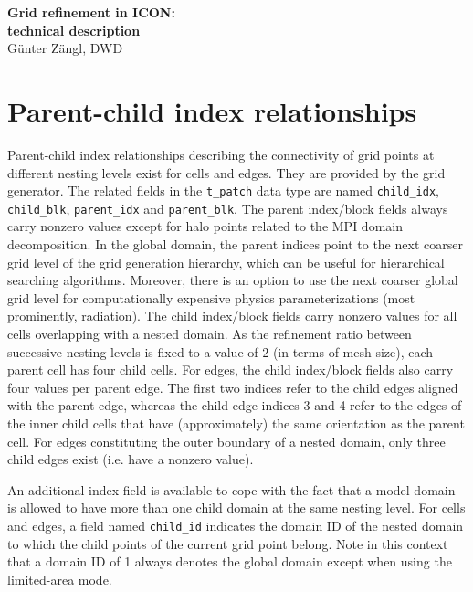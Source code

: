 \documentclass[11pt]{article}
\begin{document}
\setlength{\baselineskip}{25pt}


\begin{center}
{\huge \bf {Grid refinement in ICON: \\ technical description}} \\ \bigskip
{\Large G\"unter Z\"angl, DWD}
\end{center}

\setlength{\baselineskip}{14pt}

\bigskip

\section{Parent-child index relationships}

Parent-child index relationships describing the connectivity of grid points at different nesting levels
exist for cells and edges. They are provided by the grid generator.
The related fields in the \verb+t_patch+ data type are named \verb+child_idx+, 
\verb+child_blk+, \verb+parent_idx+ and \verb+parent_blk+. 
The parent index/block fields always carry nonzero values except for halo points related to the MPI domain
decomposition. In the global domain, the parent indices point to the next coarser grid level of the grid
generation hierarchy, which can be useful for hierarchical searching algorithms. Moreover, there is an
option to use the next coarser global grid level for computationally expensive physics parameterizations
(most prominently, radiation). The child index/block fields carry nonzero
values for all cells overlapping with a nested domain. As the refinement ratio between successive nesting
levels is fixed to a value of 2 (in terms of mesh size), each parent cell has four child cells. 
For edges, the child index/block fields also carry four values per parent edge. The first two indices
refer to the child edges aligned with the parent edge, whereas the child edge indices 3 and 4 refer
to the edges of the inner child cells that have (approximately) the same orientation as the parent cell.
For edges constituting the outer boundary of a nested domain, only three child edges exist (i.e. have a nonzero value).

An additional index field is available to cope with the fact that a model domain is allowed to have more 
than one child domain at the same nesting level. For cells and edges, a field named \verb+child_id+ indicates
the domain ID of the nested domain to which the child points of the current grid point belong. Note in this
context that a domain ID of 1 always denotes the global domain except when using the limited-area mode.
\end{document}
